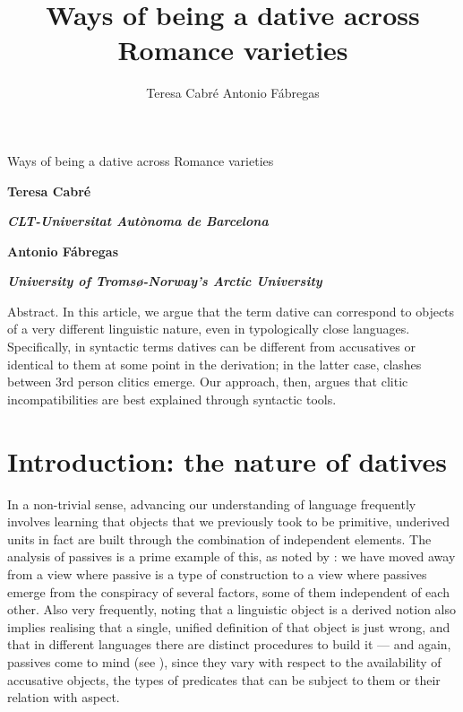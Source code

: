 \documentclass[output=paper,colorlinks,citecolor=brown]{./langscibook}
\author{Teresa Cabré\affiliation{}\lastand
Antonio Fábregas\affiliation{}}
\title{Ways of being a dative across Romance varieties}
\begin{document}
\maketitle 


\begin{styleHeading}
Ways of being a dative across Romance varieties
\end{styleHeading}

\sffamily\bfseries
Teresa Cabré

\sffamily\bfseries\itshape
CLT-Universitat Autònoma de Barcelona

\sffamily\bfseries
Antonio Fábregas

\sffamily\bfseries\itshape
University of Tromsø-Norway’s Arctic University

\begin{stylelsAbstract}
Abstract. In this article, we argue that the term dative can correspond to objects of a very different linguistic nature, even in typologically close languages. Specifically, in syntactic terms datives can be different from accusatives or identical to them at some point in the derivation; in the latter case, clashes between 3rd person clitics emerge. Our approach, then, argues that clitic incompatibilities are best explained through syntactic tools.
\end{stylelsAbstract}

\section{Introduction: the nature of datives} %

In a non-trivial sense, advancing our understanding of language frequently involves learning that objects that we previously took to be primitive, underived units in fact are built through the combination of independent elements. The analysis of passives is a prime example of this, as noted by \citet{Williams2015}: we have moved away from a view where passive is a type of construction to a view where passives emerge from the conspiracy of several factors, some of them independent of each other. Also very frequently, noting that a linguistic object is a derived notion also implies realising that a single, unified definition of that object is just wrong, and that in different languages there are distinct procedures to build it — and again, passives come to mind (see \citealt{Croft2017}), since they vary with respect to the availability of accusative objects, the types of predicates that can be subject to them or their relation with aspect. 
\end{document}
